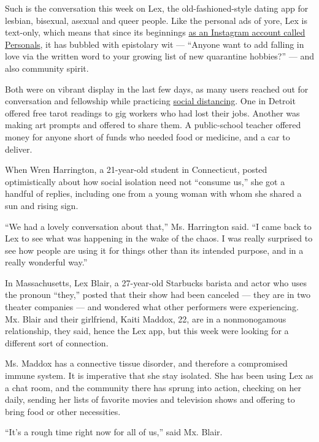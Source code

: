 Such is the conversation this week on Lex, the old-fashioned-style
dating app for lesbian, bisexual, asexual and queer people. Like the
personal ads of yore, Lex is text-only, which means that since its
beginnings
\href{https://www.nytimes3xbfgragh.onion/2018/08/04/style/lesbian-queer-dating-app.html}{as
an Instagram account called Personals}, it has bubbled with epistolary
wit --- ``Anyone want to add falling in love via the written word to
your growing list of new quarantine hobbies?'' --- and also community
spirit.

Both were on vibrant display in the last few days, as many users reached
out for conversation and fellowship while practicing
\href{https://www.nytimes3xbfgragh.onion/2020/03/16/smarter-living/coronavirus-social-distancing.html}{social
distancing}. One in Detroit offered free tarot readings to gig workers
who had lost their jobs. Another was making art prompts and offered to
share them. A public-school teacher offered money for anyone short of
funds who needed food or medicine, and a car to deliver.

When Wren Harrington, a 21-year-old student in Connecticut, posted
optimistically about how social isolation need not ``consume us,'' she
got a handful of replies, including one from a young woman with whom she
shared a sun and rising sign.

``We had a lovely conversation about that,'' Ms. Harrington said. ``I
came back to Lex to see what was happening in the wake of the chaos. I
was really surprised to see how people are using it for things other
than its intended purpose, and in a really wonderful way.''

In Massachusetts, Lex Blair, a 27-year-old Starbucks barista and actor
who uses the pronoun ``they,'' posted that their show had been canceled
--- they are in two theater companies --- and wondered what other
performers were experiencing. Mx. Blair and their girlfriend, Kaiti
Maddox, 22, are in a nonmonogamous relationship, they said, hence the
Lex app, but this week were looking for a different sort of connection.

Ms. Maddox has a connective tissue disorder, and therefore a compromised
immune system. It is imperative that she stay isolated. She has been
using Lex as a chat room, and the community there has sprung into
action, checking on her daily, sending her lists of favorite movies and
television shows and offering to bring food or other necessities.

``It's a rough time right now for all of us,'' said Mx. Blair.

